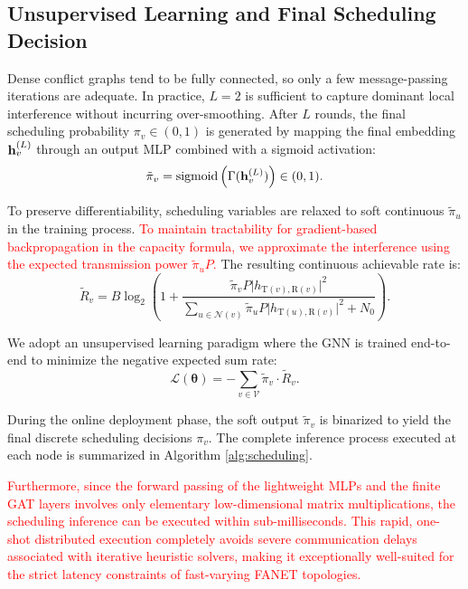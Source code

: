 \documentclass[journal]{IEEEtran}
\begin{document}
	\subsection{Unsupervised Learning and Final Scheduling Decision}
	Dense conflict graphs tend to be fully connected, so only a few message-passing iterations are adequate\cite{graphEmbedding}. In practice, $L=2$ is sufficient to capture dominant local interference without incurring over-smoothing. After $L$ rounds, the final scheduling probability $\pi_v \in (0,1)$ is generated by mapping the final embedding ${\bf h}_v^{(L)}$ through an output MLP combined with a sigmoid activation:
	\begin{equation}
		\tilde{\pi}_v = \mathrm{sigmoid}\left(\Gamma({\bf h}_v^{(L)})\right) \in (0, 1).
	\end{equation}
	
	To preserve differentiability, scheduling variables are relaxed to soft continuous $\tilde{\pi}_u$ in the training process. \textcolor{red}{To maintain tractability for gradient-based backpropagation in the capacity formula, we approximate the interference using the expected transmission power $\tilde{\pi}_u P$.} The resulting continuous achievable rate is:
	\begin{equation}
		\tilde{R}_v = B\log_2\left(1+\frac{\tilde{\pi}_vP\vert h_{\mathrm{T}(v),\mathrm{R}(v)}\vert^2}{\sum_{u\in \mathcal{N}(v)}\tilde{\pi}_u P\vert h_{\mathrm{T}(u),\mathrm{R}(v)}\vert^2+N_0}\right).
	\end{equation}
	
	\addtolength{\topmargin}{0.05in}
	We adopt an unsupervised learning paradigm where the GNN is trained end-to-end to minimize the negative expected sum rate:
	\begin{equation}
		\mathcal{L}(\boldsymbol{\theta}) = - \sum_{v\in\mathcal{V}} \tilde{\pi}_v \cdot \tilde{R}_v. \label{loss_function}
	\end{equation}
	
	During the online deployment phase, the soft output $\tilde{\pi}_v$ is binarized to yield the final discrete scheduling decisions $\pi_v$. The complete inference process executed at each node is summarized in Algorithm \ref{alg:scheduling}.
	
	\textcolor{red}{Furthermore, since the forward passing of the lightweight MLPs and the finite GAT layers involves only elementary low-dimensional matrix multiplications, the scheduling inference can be executed within sub-milliseconds. This rapid, one-shot distributed execution completely avoids severe communication delays associated with iterative heuristic solvers, making it exceptionally well-suited for the strict latency constraints of fast-varying FANET topologies.}
	
\end{document}
